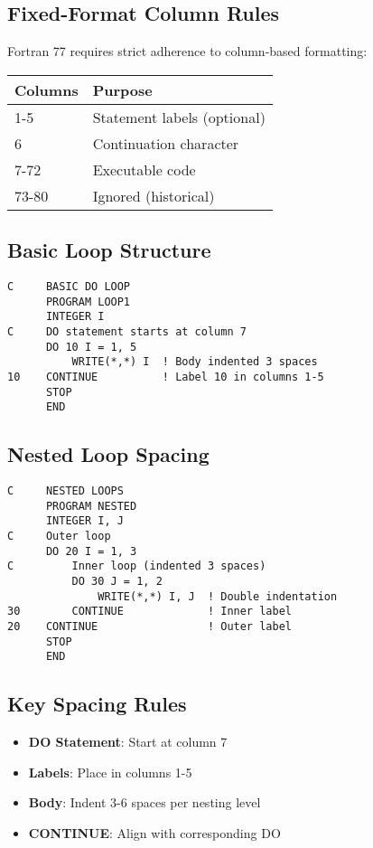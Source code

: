 \documentclass{book}
\begin{document}
\subsection*{Fixed-Format Column Rules}
Fortran 77 requires strict adherence to column-based formatting:
\begin{center}
\begin{tabular}{|l|l|}
\hline
\textbf{Columns} & \textbf{Purpose} \\ 
\hline
1-5 & Statement labels (optional) \\
6 & Continuation character \\
7-72 & Executable code \\
73-80 & Ignored (historical) \\
\hline
\end{tabular}
\end{center}

\subsection*{Basic Loop Structure}
\begin{verbatim}
C     BASIC DO LOOP
      PROGRAM LOOP1
      INTEGER I
C     DO statement starts at column 7
      DO 10 I = 1, 5
          WRITE(*,*) I  ! Body indented 3 spaces
10    CONTINUE          ! Label 10 in columns 1-5
      STOP
      END
\end{verbatim}

\subsection*{Nested Loop Spacing}
\begin{verbatim}
C     NESTED LOOPS
      PROGRAM NESTED
      INTEGER I, J
C     Outer loop
      DO 20 I = 1, 3
C         Inner loop (indented 3 spaces)
          DO 30 J = 1, 2
              WRITE(*,*) I, J  ! Double indentation
30        CONTINUE             ! Inner label
20    CONTINUE                 ! Outer label
      STOP
      END
\end{verbatim}

\subsection*{Key Spacing Rules}
\begin{itemize}
\item \textbf{DO Statement}: Start at column 7
\item \textbf{Labels}: Place in columns 1-5
\item \textbf{Body}: Indent 3-6 spaces per nesting level
\item \textbf{CONTINUE}: Align with corresponding DO
\end{itemize}
\end{document}
